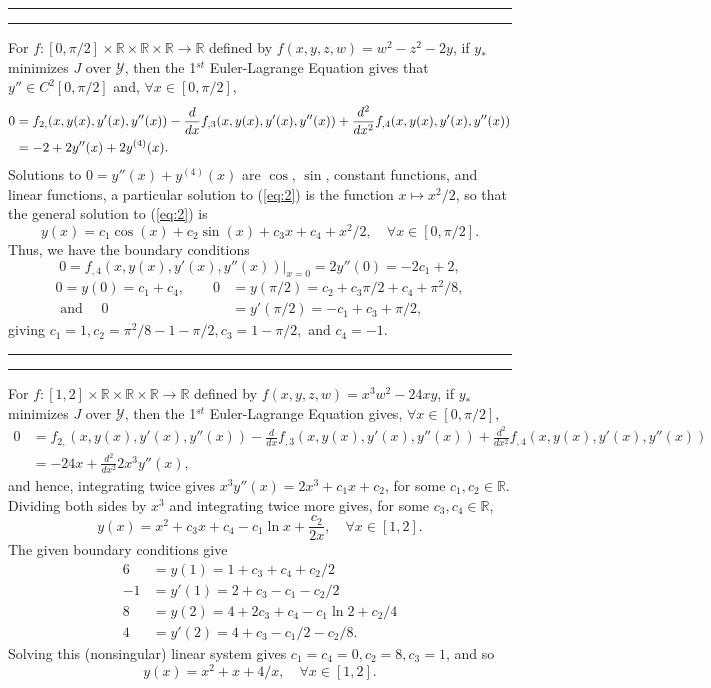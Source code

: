 \documentclass[11pt]{article}
\newcounter{questionCounter}
\newcounter{partCounter}[questionCounter]
\newenvironment{question}[2][\arabic{questionCounter}]{%
    \setcounter{partCounter}{0}%
    \vspace{.25in} \hrule \vspace{0.5em}%
        \noindent{\bf #2}%
    \vspace{0.8em} \hrule \vspace{.10in}%
    \addtocounter{questionCounter}{1}%
}{}
\newcommand{\R}{\mathbb{R}}             %
\newcommand{\Y}{\mathscr{Y}}            %
\begin{document}
\newpage
\begin{question}{Problem 2}
For $f : [0,\pi/2] \times \R \times \R \times \R \to \R$ defined by
$f(x,y,z,w) = w^2 - z^2 - 2y$, if $y_*$ minimizes $J$ over $\Y$, then the
1$^{st}$ Euler-Lagrange Equation gives that $y'' \in C^2[0,\pi/2]$ and,
$\forall x \in [0,\pi/2]$,
\begin{align}
\notag
0
 &  = f_{2,}(x,y(x),y'(x),y''(x))
        - \frac{d}{dx} f_{,3}(x,y(x),y'(x),y''(x))
        + \frac{d^2}{dx^2} f_{,4}(x,y(x),y'(x),y''(x))  \\
 &  = -2 + 2y''(x) + 2y^{(4)}(x).
\label{eq:2}
\end{align}
Solutions to $0 = y''(x) + y^{(4)}(x)$ are $\cos$, $\sin$, constant functions,
and linear functions, a particular solution to (\ref{eq:2}) is the function
$x \mapsto x^2/2$, so that the general solution to (\ref{eq:2}) is
\[y(x) = c_1\cos(x) + c_2\sin(x) + c_3x + c_4 + x^2/2,
    \quad \forall x \in [0,\pi/2].
\]
Thus, we have the boundary conditions
\[0
    = f_{,4}(x,y(x),y'(x),y''(x))\big|_{x = 0}
    = 2y''(0)
    = -2c_1 + 2,
\]
\begin{align*}
0     = y(0) = c_1 + c_4,
\quad\quad
0   & = y(\pi/2) = c_2 + c_3\pi/2 + c_4 + \pi^2/8,  \\
\mbox{ and } \quad
0   & = y'(\pi/2) = -c_1 + c_3 + \pi/2,
\end{align*}
giving $c_1 = 1,c_2 = \pi^2/8 - 1 - \pi/2, c_3 = 1 - \pi/2,$ and $c_4 = -1$.
\end{question}

\begin{question}{Problem 3}
For $f : [1,2] \times \R \times \R \times \R \to \R$ defined by
$f(x,y,z,w) = x^3w^2 - 24xy$, if $y_*$ minimizes $J$ over $\Y$, then the
1$^{st}$ Euler-Lagrange Equation gives, $\forall x \in [0,\pi/2]$,
\begin{align*}
0
 &  = f_{2,}(x,y(x),y'(x),y''(x))
        - \frac{d}{dx} f_{,3}(x,y(x),y'(x),y''(x))
        + \frac{d^2}{dx^2} f_{,4}(x,y(x),y'(x),y''(x))  \\
 &  = -24x + \frac{d^2}{dx^2} 2x^3y''(x),
\end{align*}
and hence, integrating twice gives $x^3 y''(x) = 2x^3 + c_1x + c_2$, for some
$c_1,c_2 \in \R$. Dividing both sides by $x^3$ and integrating twice more
gives, for some $c_3,c_4 \in \R$,
\[y(x) = x^2 + c_3x + c_4 - c_1 \ln x + \frac{c_2}{2x},
    \quad \forall x \in [1,2].
\]
The given boundary conditions give
\begin{align*}
6 & = y(1) = 1 + c_3 + c_4 + c_2/2 \\
-1 & = y'(1) = 2 + c_3 - c_1 - c_2/2 \\
8 & = y(2) = 4 + 2c_3 + c_4 - c_1 \ln 2 + c_2/4 \\
4 & = y'(2) = 4 + c_3 - c_1/2 - c_2/8.
\end{align*}
Solving this (nonsingular) linear system gives
$c_1 = c_4 = 0, c_2 = 8, c_3 = 1$, and so
\[y(x) = x^2 + x + 4/x, \quad \forall x \in [1,2].\]
\end{question}
\end{document}
